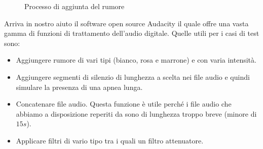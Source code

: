 \begin{center}
\begin{figure}
\centering
{}
  \caption{Processo di aggiunta del rumore}
\label{mix}
\end{figure}
\end{center}



Arriva in nostro aiuto il software open source Audacity \cite{audacity} il quale offre una vasta gamma di funzioni di trattamento dell'audio digitale. Quelle utili per i casi di test sono: 
\begin{itemize}
  \item
    Aggiungere rumore di vari tipi (bianco, rosa e marrone) e con varia intensit\`a.
  \item
    Aggiungere segmenti di silenzio di lunghezza a scelta nei file audio e quindi simulare la presenza di una apnea lunga.
  \item
    Concatenare file audio. Questa funzione \`e utile perch\'e i file audio che abbiamo a disposizione reperiti da \cite{SoundRepositories} sono di lunghezza troppo breve (minore di $15s$).
  \item
    Applicare filtri di vario tipo tra i quali un filtro attenuatore.
\end{itemize}


